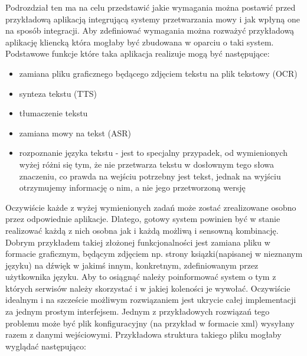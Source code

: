 Podrozdział ten ma na celu przedstawić  jakie wymagania można postawić przed przykładową aplikacją integrującą systemy przetwarzania mowy i jak wpłyną one na sposób integracji. Aby zdefiniować wymagania można rozważyć przykładową aplikację kliencką która mogłaby być zbudowana w oparciu o taki system. Podstawowe funkcje które taka aplikacja realizuje mogą być następujące:
\begin{itemize}
	\item zamiana pliku graficznego będącego zdjęciem tekstu na plik tekstowy (OCR)
	\item synteza tekstu (TTS)
	\item tłumaczenie tekstu 
	\item zamiana mowy na tekst (ASR)
	\item rozpoznanie języka tekstu - jest to specjalny przypadek, od wymienionych wyżej różni się tym, że nie przetwarza tekstu w dosłownym tego słowa znaczeniu, co prawda na wejściu potrzebny jest tekst, jednak na wyjściu otrzymujemy informację o nim, a nie jego przetworzoną wersję
\end{itemize}
Oczywiście każde z wyżej wymienionych zadań może zostać zrealizowane osobno przez odpowiednie aplikacje. Dlatego, gotowy system powinien być w stanie realizować każdą z nich osobna jak i każdą możliwą i sensowną kombinację. Dobrym przykładem takiej złożonej funkcjonalności jest zamiana pliku w formacie graficznym, będącym zdjęciem np. strony ksiązki(napisanej w nieznanym języku) na dźwięk w jakimś innym, konkretnym, zdefiniowanym przez użytkownika języku. Aby to osiągnąć należy poinformować system o tym z których serwisów należy skorzystać i w jakiej koleności je wywołać. Oczywiście idealnym i na szczeście możliwym rozwiązaniem jest ukrycie całej implementacji za jednym prostym interfejsem. Jednym z przykładowych rozwiązań tego problemu może być plik konfiguracyjny (na przykład w formacie xml) wysyłany razem z danymi wejściowymi. Przykładowa struktura takiego pliku mogłaby wyglądać następująco:
